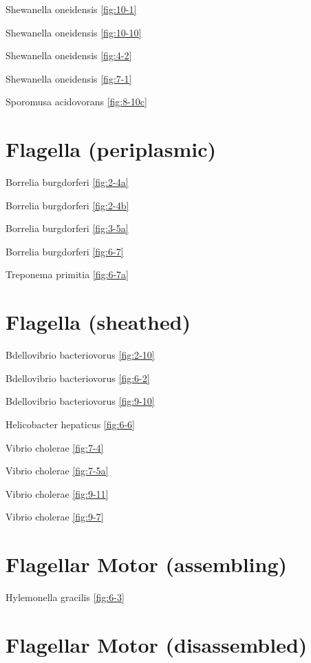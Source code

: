 \documentclass[]{tufte-book}
\begin{document}
Shewanella oneidensis \ref{fig:10-1}

Shewanella oneidensis \ref{fig:10-10}

Shewanella oneidensis \ref{fig:4-2}

Shewanella oneidensis \ref{fig:7-1}

Sporomusa acidovorans \ref{fig:8-10c}

\section*{Flagella (periplasmic)}\label{flagella-periplasmic}

Borrelia burgdorferi \ref{fig:2-4a}

Borrelia burgdorferi \ref{fig:2-4b}

Borrelia burgdorferi \ref{fig:3-5a}

Borrelia burgdorferi \ref{fig:6-7}

Treponema primitia \ref{fig:6-7a}

\section*{Flagella (sheathed)}\label{flagella-sheathed}

Bdellovibrio bacteriovorus \ref{fig:2-10}

Bdellovibrio bacteriovorus \ref{fig:6-2}

Bdellovibrio bacteriovorus \ref{fig:9-10}

Helicobacter hepaticus \ref{fig:6-6}

Vibrio cholerae \ref{fig:7-4}

Vibrio cholerae \ref{fig:7-5a}

Vibrio cholerae \ref{fig:9-11}

Vibrio cholerae \ref{fig:9-7}

\section*{Flagellar Motor
(assembling)}\label{flagellar-motor-assembling}

Hylemonella gracilis \ref{fig:6-3}

\section*{Flagellar Motor
(disassembled)}\label{flagellar-motor-disassembled}
\end{document}
